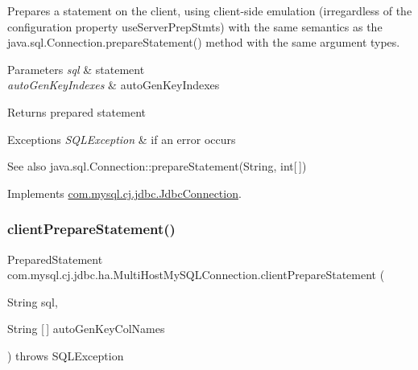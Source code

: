 Prepares a statement on the client, using client-\/side emulation (irregardless of the configuration property \textquotesingle{}use\+Server\+Prep\+Stmts\textquotesingle{}) with the same semantics as the java.\+sql.\+Connection.\+prepare\+Statement() method with the same argument types.


\begin{DoxyParams}{Parameters}
{\em sql} & statement \\
\hline
{\em auto\+Gen\+Key\+Indexes} & auto\+Gen\+Key\+Indexes \\
\hline
\end{DoxyParams}
\begin{DoxyReturn}{Returns}
prepared statement 
\end{DoxyReturn}

\begin{DoxyExceptions}{Exceptions}
{\em S\+Q\+L\+Exception} & if an error occurs\\
\hline
\end{DoxyExceptions}
\begin{DoxySeeAlso}{See also}
java.\+sql.\+Connection\+::prepare\+Statement(\+String, int\mbox{[}$\,$\mbox{]}) 
\end{DoxySeeAlso}


Implements \mbox{\hyperlink{interfacecom_1_1mysql_1_1cj_1_1jdbc_1_1_jdbc_connection_a11927338ef48e164fdd8444b6b273162}{com.\+mysql.\+cj.\+jdbc.\+Jdbc\+Connection}}.

\mbox{\label{classcom_1_1mysql_1_1cj_1_1jdbc_1_1ha_1_1_multi_host_my_s_q_l_connection_af7a6412387f62b55132775c5f9700fd9}} 
\subsubsection{\texorpdfstring{client\+Prepare\+Statement()}{clientPrepareStatement()}\hspace{0.1cm}{\footnotesize\ttfamily [5/6]}}
{\footnotesize\ttfamily Prepared\+Statement com.\+mysql.\+cj.\+jdbc.\+ha.\+Multi\+Host\+My\+S\+Q\+L\+Connection.\+client\+Prepare\+Statement (\begin{DoxyParamCaption}\item[{String}]{sql,  }\item[{String \mbox{[}$\,$\mbox{]}}]{auto\+Gen\+Key\+Col\+Names }\end{DoxyParamCaption}) throws S\+Q\+L\+Exception}

